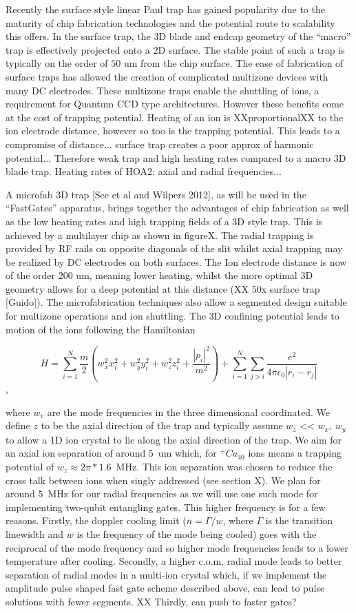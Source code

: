 \documentclass[12pt]{iopart}
\begin{document}
Recently the surface style linear Paul
trap has gained popularity due to the maturity of chip fabrication
technologies and the potential route to scalability this offers. In
the surface trap, the 3D blade and endcap geometry of the ``macro''
trap is effectively projected onto a 2D surface. The stable point of
such a trap is typically on the order of $50$ um from the chip
surface. The ease of fabrication of surface traps has allowed the
creation of complicated multizone devices with many DC electrodes.
These multizone traps enable the shuttling of ions, a requirement for
Quantum CCD type architectures. However these benefits come at the
cost of trapping potential. Heating of an ion is XXproportionalXX to
the ion electrode distance, however so too is the trapping
potential. This leads to a compromise of distance... surface trap
creates a poor approx of harmonic potential... Therefore weak trap and
high heating rates compared to a macro 3D blade trap. Heating rates of
HOA2: axial and radial frequencies...

A microfab 3D trap [See et al and Wilpers 2012], as will be used in
the ``FastGates'' apparatus, brings together the advantages of chip
fabrication as well as the low heating rates and high trapping fields
of a 3D style trap. This is achieved by a multilayer chip as shown in
figureX. The radial trapping is provided by RF rails on opposite
diagonals of the slit whilst axial trapping may be realized by DC
electrodes on both surfaces. The Ion electrode distance is now of the
order $200$ um, meaning lower heating, whilst the more optimal 3D
geometry allows for a deep potential at this distance (XX 50x surface trap [Guido]). The
microfabrication techniques also allow a segmented design suitable for
multizone operations and ion shuttling.  The 3D confining potential
leads to motion of the ions following the Hamiltonian

$$ H = \sum_{i=1}^N \frac{m}{2}(w_x^2x_i^2 + w_y^2y_i^2 + w_z^2z_i^2 + \frac{|p_i|^2}{m^2}) + \sum_{i=1}^N\sum_{j>i}\frac{e^2}{4\pi\epsilon_0|r_i - r_j|}$$,

where $w_v$ are the mode frequencies in the three dimensional
coordinated. We define $z$ to be the axial direction of the trap and
typically assume $w_z$ << $w_x$, $w_y$ to allow a 1D ion crystal to
lie along the axial direction of the trap. We aim for an axial ion
separation of around $5$~um which, for $^+Ca_{40}$ ions means a
trapping potential of $w_z \approx 2\pi * 1.6$~MHz. This ion
separation was chosen to reduce the cross talk between ions when
singly addressed (see section X). We plan for around $5$~MHz for our
radial frequencies as we will use one such mode for implementing
two-qubit entangling gates. This higher frequency is for a few
reasons. Firstly, the doppler cooling limit
($\overline{n} = \Gamma/w$, where $\Gamma$ is the transition linewidth
and $w$ is the frequency of the mode being cooled) goes with the
reciprocal of the mode frequency and so higher mode frequencies leads
to a lower temperature after cooling. Secondly, a higher c.o.m. radial
mode leads to better separation of radial modes in a multi-ion crystal
which, if we implement the amplitude pulse shaped fast gate scheme
described above, can lead to pulse solutions with fewer segments. XX
Thirdly, can push to faster gates?
\end{document}
